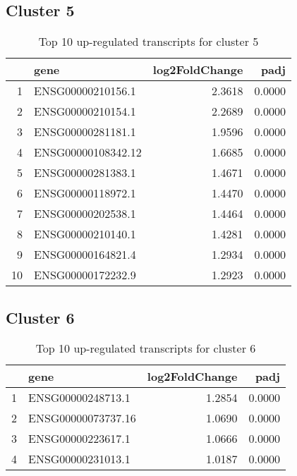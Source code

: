 \documentclass{article}
\begin{document}
\subsection{Cluster 5 }
\begin{table}[H]
\centering
\begin{tabularx}{\textwidth}{rlrr}
  \hline
 & gene & log2FoldChange & padj \\ 
  \hline
1 & ENSG00000210156.1 & 2.3618 & 0.0000 \\ 
  2 & ENSG00000210154.1 & 2.2689 & 0.0000 \\ 
  3 & ENSG00000281181.1 & 1.9596 & 0.0000 \\ 
  4 & ENSG00000108342.12 & 1.6685 & 0.0000 \\ 
  5 & ENSG00000281383.1 & 1.4671 & 0.0000 \\ 
  6 & ENSG00000118972.1 & 1.4470 & 0.0000 \\ 
  7 & ENSG00000202538.1 & 1.4464 & 0.0000 \\ 
  8 & ENSG00000210140.1 & 1.4281 & 0.0000 \\ 
  9 & ENSG00000164821.4 & 1.2934 & 0.0000 \\ 
  10 & ENSG00000172232.9 & 1.2923 & 0.0000 \\ 
   \hline
\end{tabularx}
\caption{Top 10 up-regulated transcripts for cluster 5} 
\label{tab:q3_1_5}
\end{table}
\subsection{Cluster 6 }
\begin{table}[H]
\centering
\begin{tabularx}{\textwidth}{rlrr}
  \hline
 & gene & log2FoldChange & padj \\ 
  \hline
1 & ENSG00000248713.1 & 1.2854 & 0.0000 \\ 
  2 & ENSG00000073737.16 & 1.0690 & 0.0000 \\ 
  3 & ENSG00000223617.1 & 1.0666 & 0.0000 \\ 
  4 & ENSG00000231013.1 & 1.0187 & 0.0000 \\ 
   \hline
\end{tabularx}
\caption{Top 10 up-regulated transcripts for cluster 6} 
\label{tab:q3_1_6}
\end{table}
\end{document}
